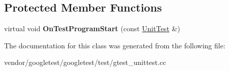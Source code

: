 \subsection*{Protected Member Functions}
\begin{DoxyCompactItemize}
\item 
\mbox{\label{class_test_listener_a6218f522f5b6b37050ff0ea630ac5fd3}} 
virtual void {\bfseries On\+Test\+Program\+Start} (const \mbox{\hyperlink{classtesting_1_1_unit_test}{Unit\+Test}} \&)
\end{DoxyCompactItemize}


The documentation for this class was generated from the following file\+:\begin{DoxyCompactItemize}
\item 
vendor/googletest/googletest/test/gtest\+\_\+unittest.\+cc\end{DoxyCompactItemize}
